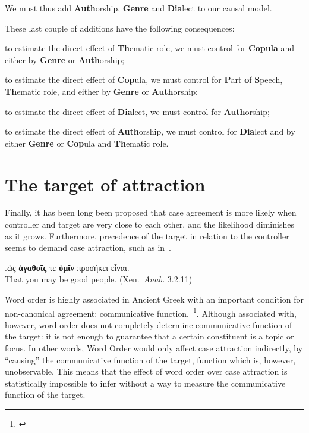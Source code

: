 \documentclass[a4paper, 12pt, article]{memoir}
\begin{document}
We must thus add \textbf{Auth}orship, \textbf{Genre} and \textbf{Dia}lect to our
causal model.



These last couple of additions have the following consequences:
\begin{compactitem}
  \item to estimate the direct effect of \textbf{Th}ematic role, we must control
        for \textbf{Copula} and either by \textbf{Genre} or \textbf{Auth}orship;
  \item to estimate the direct effect of \textbf{Cop}ula, we must control for
        \textbf{P}art \textbf{o}f \textbf{S}peech, \textbf{Th}ematic role, and either
        by \textbf{Genre} or \textbf{Auth}orship;
  \item to estimate the direct effect of \textbf{Dia}lect, we must control for
        \textbf{Auth}orship;
  \item to estimate the direct effect of \textbf{Auth}orship, we must control for
        \textbf{Dia}lect and by either \textbf{Genre} or \textbf{Cop}ula and
        \textbf{Th}ematic role.
\end{compactitem}





\chapter{The target of attraction} %

Finally, it has been long been proposed that case agreement is more likely when
controller and target are very close to each other, and the likelihood
diminishes as it grows.
Furthermore, precedence of the target in relation to the controller
seems to demand case attraction, such as in~\Next.

\ex.ὡς \textbf{ἀγαθοῖς} τε \textbf{ὑμῖν} προσήκει εἶναι.\\
That you may be good people. (Xen.\ \emph{Anab.} 3.2.11)


Word order is highly associated in Ancient Greek with an important
condition for non\hyp{}canonical agreement: communicative
function.~\footnote{\textcite{Dik1995,Dik2007,Matic2003,Allan2012}}.
Although associated with, however, word order does not completely determine
communicative function of the target: it is not enough to guarantee that a
certain constituent is a topic or focus.
In other words, Word Order would only affect case attraction indirectly, by
``causing'' the communicative function of the target, function which is, however,
unobservable.
This means that the effect of word order over case attraction is statistically
impossible to infer without a way to measure the communicative function of the
target.
\end{document}
